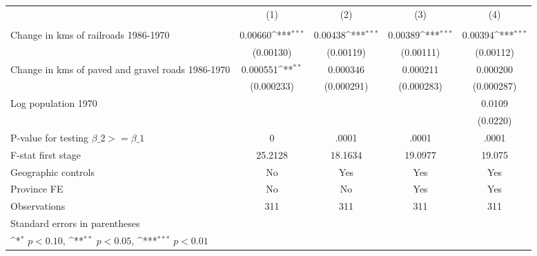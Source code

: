 {
\def\sym#1{\ifmmode^{#1}\else\(^{#1}\)\fi}
\begin{tabular}{l*{4}{c}}
\hline\hline
                &\multicolumn{1}{c}{(1)}&\multicolumn{1}{c}{(2)}&\multicolumn{1}{c}{(3)}&\multicolumn{1}{c}{(4)}\\
                &\multicolumn{1}{c}{}&\multicolumn{1}{c}{}&\multicolumn{1}{c}{}&\multicolumn{1}{c}{}\\
\hline
Change in kms of railroads 1986-1970&  0.00660\sym{***}&  0.00438\sym{***}&  0.00389\sym{***}&  0.00394\sym{***}\\
                &(0.00130)         &(0.00119)         &(0.00111)         &(0.00112)         \\
[1em]
Change in kms of paved and gravel roads 1986-1970& 0.000551\sym{**} & 0.000346         & 0.000211         & 0.000200         \\
                &(0.000233)         &(0.000291)         &(0.000283)         &(0.000287)         \\
[1em]
Log population 1970&                  &                  &                  &   0.0109         \\
                &                  &                  &                  & (0.0220)         \\
\hline
P-value for testing $\beta\_{2} >= \beta\_{1}$&        0         &    .0001         &    .0001         &    .0001         \\
F-stat first stage&  25.2128         &  18.1634         &  19.0977         &   19.075         \\
Geographic controls&       No         &      Yes         &      Yes         &      Yes         \\
Province FE     &       No         &       No         &      Yes         &      Yes         \\
Observations    &      311         &      311         &      311         &      311         \\
\hline\hline
\multicolumn{5}{l}{\footnotesize Standard errors in parentheses}\\
\multicolumn{5}{l}{\footnotesize \sym{*} \(p<0.10\), \sym{**} \(p<0.05\), \sym{***} \(p<0.01\)}\\
\end{tabular}
}
